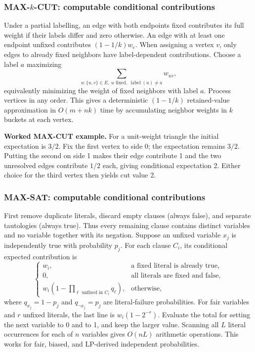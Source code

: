 \documentclass[10pt]{article}
\theoremstyle{definition}
\begin{document}
\subsubsection*{MAX-$k$-CUT: computable conditional contributions}
Under a partial labelling, an edge with both endpoints fixed contributes its
full weight if their labels differ and zero otherwise. An edge with at least
one endpoint unfixed contributes $(1-1/k)w_e$. When assigning a vertex $v$,
only edges to already fixed neighbors have label-dependent contributions.
Choose a label $a$ maximizing
\[
  \sum_{u:\{u,v\}\in E,\;u\text{ fixed},\;\operatorname{label}(u)\ne a}w_{uv},
\]
equivalently minimizing the weight of fixed neighbors with label $a$.
Process vertices in any order. This gives a deterministic
$(1-1/k)$ retained-value approximation in $O(m+nk)$ time by accumulating
neighbor weights in $k$ buckets at each vertex.

\textbf{Worked MAX-CUT example.}
For a unit-weight triangle the initial expectation is $3/2$. Fix the first
vertex to side 0; the expectation remains $3/2$. Putting the second on side 1
makes their edge contribute 1 and the two unresolved edges contribute $1/2$
each, giving conditional expectation 2. Either choice for the third vertex
then yields cut value 2.

\subsubsection*{MAX-SAT: computable conditional contributions}
First remove duplicate literals, discard empty clauses (always false), and
separate tautologies (always true). Thus every remaining clause contains
distinct variables and no variable together with its negation. Suppose an
unfixed variable $x_j$ is independently true with probability $p_j$.
For each clause $C_i$, its conditional expected contribution is
\[
  \begin{cases}
    w_i, &\text{a fixed literal is already true},\\
    0, &\text{all literals are fixed and false},\\
    w_i\left(1-\displaystyle\prod_{\ell\text{ unfixed in }C_i}
       q_\ell\right), &\text{otherwise},
  \end{cases}
\]
where $q_{x_j}=1-p_j$ and $q_{\neg x_j}=p_j$ are literal-failure
probabilities. For fair variables and $r$ unfixed literals, the last line is
$w_i(1-2^{-r})$. Evaluate the total for setting the next variable to 0 and
to 1, and keep the larger value. Scanning all $L$ literal occurrences for
each of $n$ variables gives $O(nL)$ arithmetic operations. This works for
fair, biased, and LP-derived independent probabilities.
\end{document}
